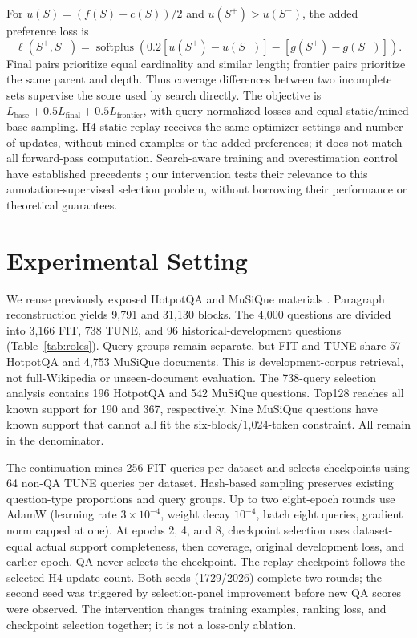 \documentclass[runningheads]{llncs}
\begin{document}
For $u(S)=(f(S)+c(S))/2$ and $u(S^+)>u(S^-)$, the added preference loss is
\begin{equation}
\ell(S^+,S^-)=\operatorname{softplus}\!\left(
0.2[u(S^+)-u(S^-)]-[g(S^+)-g(S^-)]\right).
\end{equation}
Final pairs prioritize equal cardinality and similar length; frontier pairs
prioritize the same parent and depth. Thus coverage differences between two
incomplete sets supervise the score used by search directly. The objective
is $L_{\mathrm{base}}+0.5L_{\mathrm{final}}+0.5L_{\mathrm{frontier}}$,
with query-normalized losses and equal static/mined base sampling.
H4 static replay receives the same optimizer settings and number of updates,
without mined examples or the added preferences; it does not match all
forward-pass computation. Search-aware training and
overestimation control have established precedents
\cite{wiseman2016bso,trabucco2021com}; our intervention tests their relevance
to this annotation-supervised selection problem, without borrowing their
performance or theoretical guarantees.

\section{Experimental Setting}
We reuse previously exposed HotpotQA and MuSiQue materials
\cite{yang2018hotpotqa,trivedi2022musique}. Paragraph reconstruction yields
9,791 and 31,130 blocks. The 4,000 questions are divided into 3,166
FIT, 738 TUNE, and 96 historical-development questions (Table~\ref{tab:roles}).
Query groups remain separate, but FIT and TUNE share 57 HotpotQA and 4,753 MuSiQue documents.
This is development-corpus retrieval, not full-Wikipedia or unseen-document
evaluation. The 738-query selection analysis contains 196 HotpotQA and 542
MuSiQue questions. Top128 reaches all known support for 190 and 367,
respectively. Nine MuSiQue questions have known support that cannot all fit
the six-block/1,024-token constraint. All remain in the denominator.


The continuation mines 256 FIT queries per dataset and selects checkpoints
using 64 non-QA TUNE queries per dataset. Hash-based sampling preserves
existing question-type proportions and query groups. Up to two eight-epoch
rounds use AdamW (learning rate $3\times10^{-4}$, weight decay $10^{-4}$,
batch eight queries, gradient norm capped at one). At epochs 2, 4, and 8,
checkpoint selection uses dataset-equal actual support completeness, then
coverage, original development loss, and earlier epoch. QA never selects
the checkpoint. The replay checkpoint follows the selected H4 update count.
Both seeds (1729/2026) complete two rounds; the second seed was triggered
by selection-panel improvement before new QA scores were observed.
The intervention changes training examples, ranking loss, and checkpoint
selection together; it is not a loss-only ablation.
\end{document}

